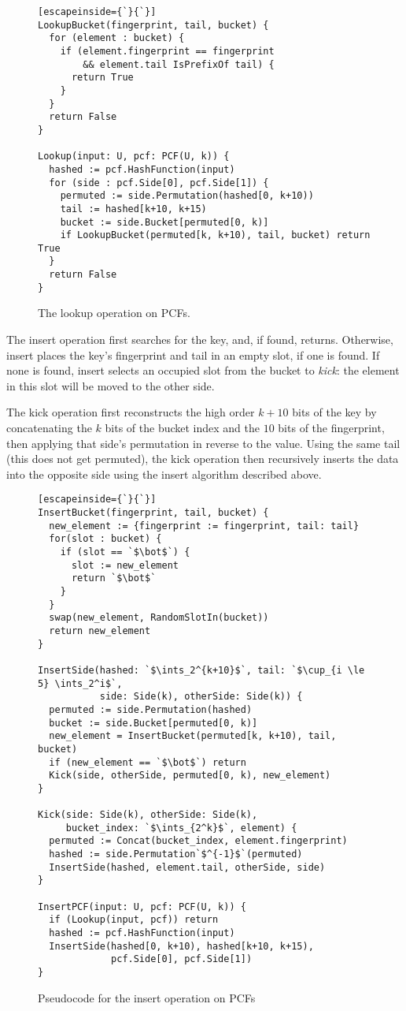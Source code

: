 \documentclass[letterpaper, 11pt]{article}
\newcommand{\ints}{\mathbb{Z}}
\begin{document}
\begin{figure}
\begin{lstlisting}[escapeinside={`}{`}]
LookupBucket(fingerprint, tail, bucket) {
  for (element : bucket) {
    if (element.fingerprint == fingerprint
        && element.tail IsPrefixOf tail) {
      return True
    }
  }
  return False
}

Lookup(input: U, pcf: PCF(U, k)) {
  hashed := pcf.HashFunction(input)
  for (side : pcf.Side[0], pcf.Side[1]) {
    permuted := side.Permutation(hashed[0, k+10))
    tail := hashed[k+10, k+15)
    bucket := side.Bucket[permuted[0, k)]
    if LookupBucket(permuted[k, k+10), tail, bucket) return True
  }
  return False
}
\end{lstlisting}
\caption{The lookup operation on PCFs.
}
\end{figure}

The insert operation first searches for the key, and, if found, returns.
Otherwise, insert places the key's fingerprint and tail in an empty slot, if one is found.
If none is found, insert selects an occupied slot from the bucket to {\em kick}: the element in this slot will be moved to the other side.

The kick operation first reconstructs the high order $k + 10$ bits of the key by concatenating the $k$ bits of the bucket index and the $10$ bits of the fingerprint, then applying that side's permutation in reverse to the value.
Using the same tail (this does not get permuted), the kick operation then recursively inserts the data into the opposite side using the insert algorithm described above.

\begin{figure}
\begin{lstlisting}[escapeinside={`}{`}]
InsertBucket(fingerprint, tail, bucket) {
  new_element := {fingerprint := fingerprint, tail: tail}
  for(slot : bucket) {
    if (slot == `$\bot$`) {
      slot := new_element
      return `$\bot$`
    }
  }
  swap(new_element, RandomSlotIn(bucket))
  return new_element
}

InsertSide(hashed: `$\ints_2^{k+10}$`, tail: `$\cup_{i \le 5} \ints_2^i$`,
           side: Side(k), otherSide: Side(k)) {
  permuted := side.Permutation(hashed)
  bucket := side.Bucket[permuted[0, k)]
  new_element = InsertBucket(permuted[k, k+10), tail, bucket)
  if (new_element == `$\bot$`) return
  Kick(side, otherSide, permuted[0, k), new_element)
}

Kick(side: Side(k), otherSide: Side(k),
     bucket_index: `$\ints_{2^k}$`, element) {
  permuted := Concat(bucket_index, element.fingerprint)
  hashed := side.Permutation`$^{-1}$`(permuted)
  InsertSide(hashed, element.tail, otherSide, side)
}

InsertPCF(input: U, pcf: PCF(U, k)) {
  if (Lookup(input, pcf)) return
  hashed := pcf.HashFunction(input)
  InsertSide(hashed[0, k+10), hashed[k+10, k+15),
             pcf.Side[0], pcf.Side[1])
}
\end{lstlisting}
\caption{Pseudocode for the insert operation on PCFs}
\end{figure}
\end{document}
